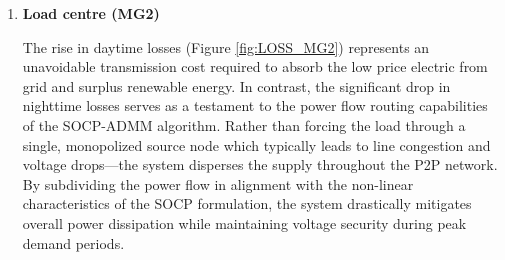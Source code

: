 \documentclass[preprint,12pt]{elsarticle}
\begin{document}
\begin{enumerate}
        This jump is a direct consequence of the long-distance power routing identified in section \ref{sec:lv2:spatiotemporal_dispatch}. In the Base Case, energy is consumed locally while in the Trade Case, power from MG1 and MG3 must traverse the distribution backbone (MG0) to reach neighboring, power-deficient grids MG2 (Figure \ref{fig:LOSS_MG1} and Figure \ref{fig:LOSS_MG3}). The physical consequence is a massive active power injection into the network, leading to a spike in Joule heating $\ell_{n,t} \cdot r_n$ losses. 
        A secondary loss increment occurs during the evening peak load periods when RE generation diminishes. In the isolated state, MGs are compelled to supply peak demand by initiating local DG units or deep-discharging BESS. The decentralized trading model resolves this by facilitating significant power imports from the main grid or peer MGs ($P_{trade, n,t} \gg 0$). Consequently, the influx of imported power traveling through the distribution lines once again elevates the squared current magnitude $\ell_{n,t}$.

        \item \textbf{Load centre (MG2)}

        The rise in daytime losses (Figure \ref{fig:LOSS_MG2}) represents an unavoidable transmission cost required to absorb the low price electric from grid and surplus renewable energy. In contrast, the significant drop in nighttime losses serves as a testament to the power flow routing capabilities of the SOCP-ADMM algorithm. Rather than forcing the load through a single, monopolized source node which typically leads to line congestion and voltage drops—the system disperses the supply throughout the P2P network. By subdividing the power flow in alignment with the non-linear characteristics of the SOCP formulation, the system drastically mitigates overall power dissipation while maintaining voltage security during peak demand periods.
    \end{enumerate}
    
\end{document}

